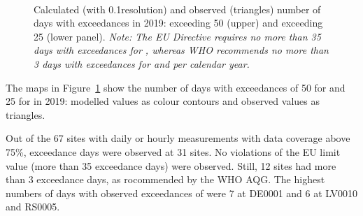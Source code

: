 \begin{figure}[ht]
  \\
  \vspace{0.5cm}
\caption{Calculated (with 0.1\degrees resolution) and observed (triangles) number of days with
  exceedances in 2019: \PM[10] exceeding 50 \ug (upper) and \PM[2.5]
  exceeding 25 \ug (lower panel). \textit{Note: The EU Directive requires no
    more than 35 days with exceedances for \PM[10], whereas WHO
    recommends no more than 3 days with exceedances for \PM[10] and
    \PM[2.5] per calendar year. }}
\label{fig:PMexceed}
\end{figure}


The maps in Figure~\ref{fig:PMexceed} show the number of days with
exceedances of 50 \ug for \PM[10] and 25 \ug for \PM[2.5] in 2019:
modelled values as colour contours and observed values as triangles.

Out of the 67 sites with daily or hourly \PM[10] measurements with data
coverage above 75\%, exceedance days were observed at 31 sites. No
violations of the \PM[10] EU limit value (more than 35 exceedance
days) were observed. Still, 12 sites had more than 3 exceedance days, as rocommended by the WHO AQG. The highest numbers of days
with observed exceedances of \PM[10] were 7 at DE0001 and 6 at LV0010 and RS0005.

